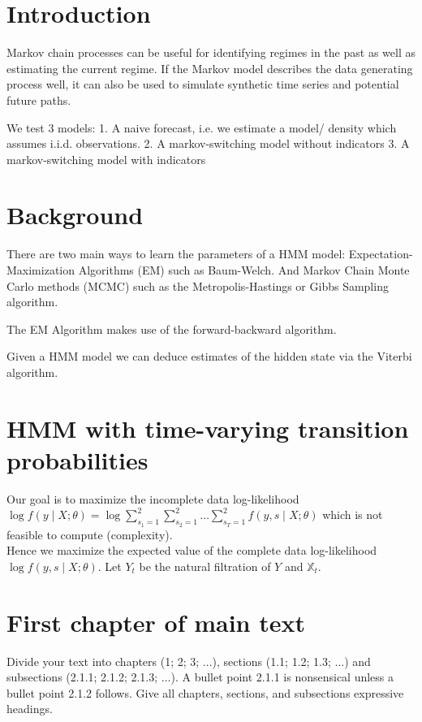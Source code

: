 \documentclass[11pt,a4paper]{article}
\begin{document}
\section{Introduction}
Markov chain processes can be useful for identifying regimes in the past as well as estimating the current regime. %
If the Markov model describes the data generating process well, it can also be used to simulate synthetic time series and potential future paths. %

We test 3 models: 
1. A naive forecast, i.e. we estimate a model/ density which assumes i.i.d. observations. 
2. A markov-switching model without indicators
3. A markov-switching model with indicators

\section{Background}

There are two main ways to learn the parameters of a HMM model: Expectation-Maximization Algorithms (EM) such as Baum-Welch. And Markov Chain Monte Carlo methods (MCMC) such as the Metropolis-Hastings or Gibbs Sampling algorithm.

The EM Algorithm makes use of the forward-backward algorithm.

Given a HMM model we can deduce estimates of the hidden state via the Viterbi algorithm.

\section{HMM with time-varying transition probabilities}
Our goal is to maximize the incomplete data log-likelihood $\log f(y \mid X ; \theta)=\log \sum_{s_{1}=1}^{2} \sum_{s_{2}=1}^{2} \ldots \sum_{s_{T}=1}^{2} f(y, s \mid X ; \theta)$ which is not feasible to compute (complexity). \\
Hence we maximize the expected value of the complete data log-likelihood $\log f(y, s \mid X ; \theta)$. Let $Y_t$ be the natural filtration of $Y$ and $\mathbb{X}_t$.
\section{First chapter of main text}

Divide your text into chapters (1; 2; 3; ...), sections (1.1; 1.2; 1.3; ...) and subsections (2.1.1; 2.1.2; 2.1.3; ...). A bullet point 2.1.1 is nonsensical unless a bullet point 2.1.2 follows. Give all chapters, sections, and subsections expressive headings.
\newpage
\end{document}
